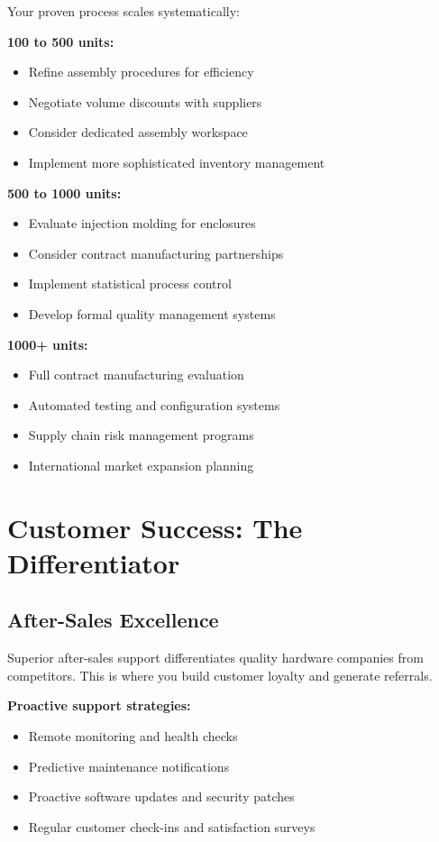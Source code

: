 Your proven process scales systematically:

\textbf{100 to 500 units:}
\begin{itemize}
\item Refine assembly procedures for efficiency
\item Negotiate volume discounts with suppliers
\item Consider dedicated assembly workspace
\item Implement more sophisticated inventory management
\end{itemize}

\textbf{500 to 1000 units:}
\begin{itemize}
\item Evaluate injection molding for enclosures
\item Consider contract manufacturing partnerships
\item Implement statistical process control
\item Develop formal quality management systems
\end{itemize}

\textbf{1000+ units:}
\begin{itemize}
\item Full contract manufacturing evaluation
\item Automated testing and configuration systems
\item Supply chain risk management programs
\item International market expansion planning
\end{itemize}

\section{Customer Success: The Differentiator}

\subsection{After-Sales Excellence}

Superior after-sales support differentiates quality hardware companies from competitors. This is where you build customer loyalty and generate referrals.

\textbf{Proactive support strategies:}
\begin{itemize}
\item Remote monitoring and health checks
\item Predictive maintenance notifications
\item Proactive software updates and security patches
\item Regular customer check-ins and satisfaction surveys
\end{itemize}


